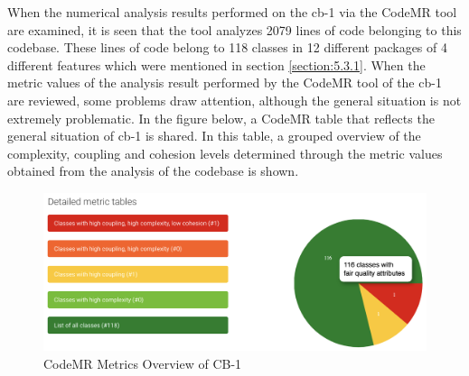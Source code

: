 When the numerical analysis results performed on the cb-1 via the CodeMR tool are examined, it is seen that the tool analyzes 2079 lines of code belonging to this codebase. These lines of code belong to 118 classes in 12 different packages of 4 different features which were mentioned in section \ref{section:5.3.1}. When the metric values of the analysis result performed by the CodeMR tool of the cb-1 are reviewed, some problems draw attention, although the general situation is not extremely problematic. In the figure below, a CodeMR table that reflects the general situation of cb-1 is shared. In this table, a grouped overview of the complexity, coupling and cohesion levels determined through the metric values obtained from the analysis of the codebase is shown.
\begin{figure}[ht!]
    \centering
    \includegraphics[scale=0.45]{figures/cb-1-metric-table.png}
    \caption{CodeMR Metrics Overview of CB-1}
    \label{fig:cb-1-metric-table.png}
\end{figure}
\FloatBarrier
